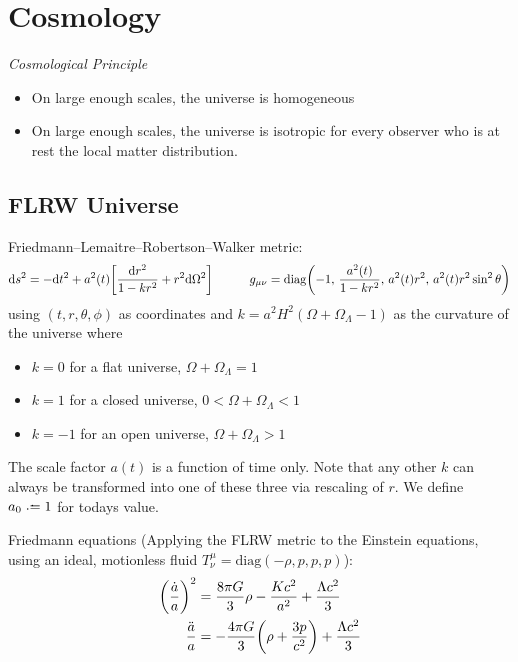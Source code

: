 \section{Cosmology}
	\emph{Cosmological Principle}
	\begin{itemize}
		\item On large enough scales, the universe is homogeneous
		\item On large enough scales, the universe is isotropic for every observer who is at rest \wrt the local matter distribution.
	\end{itemize}

	\subsection{FLRW Universe}
		Friedmann--Lemaitre--Robertson--Walker metric:
		\begin{equation}
			\dd s^2 = -\dd t^2 + a^2(t) \qty[\frac{\dd r^2}{1-kr^2} + r^2 \dd \Omega^2]
			\hspace{30pt}
			g_{\mu\nu} = \mathrm{diag}\qty(-1,\, \frac{a^2(t)}{1-kr^2},\, a^2(t) r^2,\, a^2(t) r^2 \sin^2 \theta)
		\end{equation}
		using $(t, r, \theta, \phi)$ as coordinates and $k = a^2 H^2 ( \Omega + \Omega_\Lambda - 1)$ as the curvature of the universe where
		\begin{itemize}
			\item $k=0$ for a flat universe, \ie $\Omega + \Omega_\Lambda = 1$
			\item $k=1$ for a closed universe, \ie $0 < \Omega + \Omega_\Lambda < 1$
			\item $k=-1$ for an open universe, \ie $\Omega + \Omega_\Lambda > 1$
		\end{itemize}
		The scale factor $a(t)$ is a function of time only. Note that any other $k$ can always be transformed into one of these three via rescaling of $r$. We define $a_0 \defeq 1$ for todays value.

		\noindent
		Friedmann equations (Applying the FLRW metric to the Einstein equations, using an ideal, motionless fluid $T^\mu_\nu = \text{diag}(-\rho, p, p, p)$):
		\begin{equation}
			\begin{aligned}
				\qty(\frac{\dot{a}}{a})^2 &= \frac{8 \pi G}{3} \rho - \frac{K c^2}{a^2} + \frac{\Lambda c^2}{3} \\
				\frac{\ddot{a}}{a} &= -\frac{4 \pi G}{3} \qty(\rho + \frac{3p}{c^2}) + \frac{\Lambda c^2}{3} \\
			\end{aligned}
		\end{equation}

